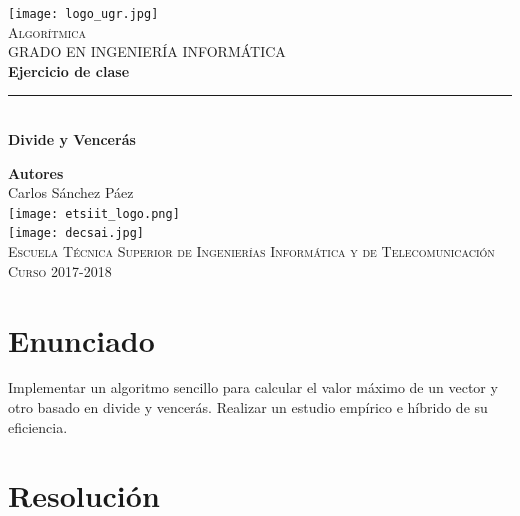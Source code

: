 \documentclass[12pt,spanish]{article}
\begin{document}
\begin{titlepage}

\newlength{\centeroffset}
\setlength{\centeroffset}{-0.5\oddsidemargin}
\addtolength{\centeroffset}{0.5\evensidemargin}
\thispagestyle{empty}

\noindent\hspace*{\centeroffset}
\begin{minipage}{\textwidth}

\centering
\texttt{[image: logo\_ugr.jpg]}\\[1.4cm]

\textsc{ \Large Algorítmica\\[0.2cm]}
\textsc{GRADO EN INGENIERÍA INFORMÁTICA}\\[1cm]

{\Huge\bfseries Ejercicio de clase\\}
\noindent\rule[-1ex]{\textwidth}{3pt}\\[3.5ex]
{\large\bfseries Divide y Vencerás}
\end{minipage}

\vspace{1.5cm}
\noindent\hspace*{\centeroffset}
\begin{minipage}{\textwidth}
\centering

\textbf{Autores}\\ {Carlos Sánchez Páez}\\[2.5ex]
\texttt{[image: etsiit\_logo.png]}\\[0.1cm]
\vspace{1.5cm}
\texttt{[image: decsai.jpg]}\\[0.1cm]
\vspace{1cm}
\textsc{Escuela Técnica Superior de Ingenierías Informática y de Telecomunicación}\\
\vspace{1cm}
\textsc{Curso 2017-2018}
\end{minipage}
\end{titlepage}
\tableofcontents
\thispagestyle{empty}
\listoftables
\newpage
\setcounter{page}{1}

\section{Enunciado}
\large{Implementar un algoritmo sencillo para calcular el valor máximo de un vector y otro basado en divide y vencerás. Realizar un estudio empírico e híbrido de su eficiencia.}

\section{Resolución}
\end{document}
